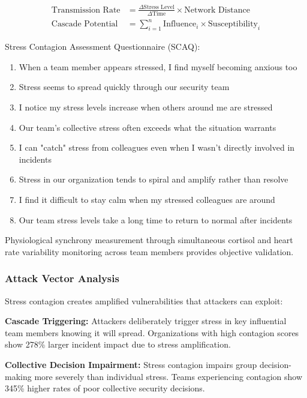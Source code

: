 \documentclass[11pt,a4paper]{article}
\begin{document}
\begin{align}
\text{Transmission Rate} &= \frac{\Delta \text{Stress Level}}{\Delta \text{Time}} \times \text{Network Distance} \\
\text{Cascade Potential} &= \sum_{i=1}^{n} \text{Influence}_i \times \text{Susceptibility}_i
\end{align}

Stress Contagion Assessment Questionnaire (SCAQ):

\begin{enumerate}
\item When a team member appears stressed, I find myself becoming anxious too
\item Stress seems to spread quickly through our security team
\item I notice my stress levels increase when others around me are stressed
\item Our team's collective stress often exceeds what the situation warrants
\item I can "catch" stress from colleagues even when I wasn't directly involved in incidents
\item Stress in our organization tends to spiral and amplify rather than resolve
\item I find it difficult to stay calm when my stressed colleagues are around
\item Our team stress levels take a long time to return to normal after incidents
\end{enumerate}

Physiological synchrony measurement through simultaneous cortisol and heart rate variability monitoring across team members provides objective validation.

\subsubsection{Attack Vector Analysis}

Stress contagion creates amplified vulnerabilities that attackers can exploit:

\textbf{Cascade Triggering:} Attackers deliberately trigger stress in key influential team members knowing it will spread. Organizations with high contagion scores show 278\% larger incident impact due to stress amplification\cite{cascade2022}.

\textbf{Collective Decision Impairment:} Stress contagion impairs group decision-making more severely than individual stress. Teams experiencing contagion show 345\% higher rates of poor collective security decisions\cite{collective2023}.
\end{document}
